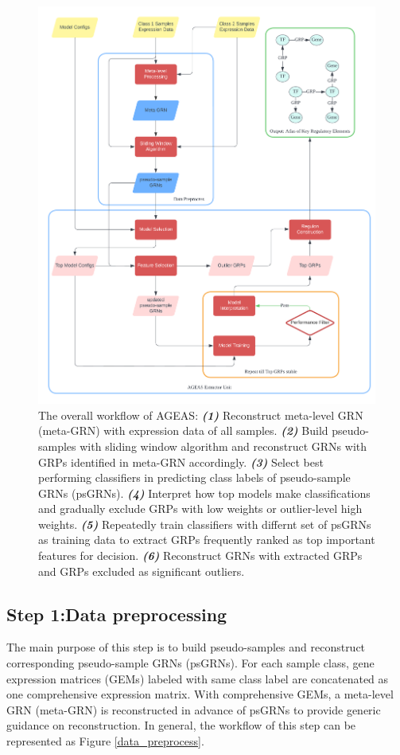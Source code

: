 \documentclass[fleqn,10pt]{wlscirep}
\begin{document}
  \begin{figure}[ht]
  \centering
  \includegraphics[width=0.8\linewidth, keepaspectratio,]{../images/summary_trans.png}
  \caption{
    The overall workflow of AGEAS:
    \textbf{\emph{(1)}} Reconstruct meta-level GRN (meta-GRN) with expression data of all samples.
    \textbf{\emph{(2)}} Build pseudo-samples with sliding window algorithm and reconstruct GRNs with GRPs identified in meta-GRN accordingly.
    \textbf{\emph{(3)}} Select best performing classifiers in predicting class labels of pseudo-sample GRNs (psGRNs).
    \textbf{\emph{(4)}} Interpret how top models make classifications and gradually exclude GRPs with low weights or outlier-level high weights.
    \textbf{\emph{(5)}} Repeatedly train classifiers with differnt set of psGRNs as training data to extract GRPs frequently ranked as top important features for decision.
    \textbf{\emph{(6)}} Reconstruct GRNs with extracted GRPs and GRPs excluded as significant outliers.
  }
  \label{workflow}
  \end{figure}

  \subsection*{Step 1:Data preprocessing}
    \label{step1}
    The main purpose of this step is to build pseudo-samples and reconstruct corresponding pseudo-sample GRNs (psGRNs).
    For each sample class, gene expression matrices (GEMs) labeled with same class label are concatenated as one comprehensive expression matrix.
    With comprehensive GEMs, a meta-level GRN (meta-GRN) is reconstructed in advance of psGRNs to provide generic guidance on reconstruction.
    In general, the workflow of this step can be represented as Figure \ref{data_preprocess}.
\end{document}
